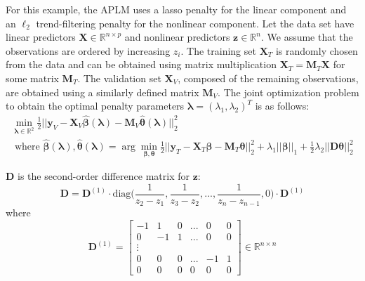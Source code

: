 \documentclass[10pt,letterpaper]{article}
\begin{document}
For this example, the APLM uses a lasso penalty for the linear component and an $\ell_2$ trend-filtering penalty for the nonlinear component. Let the data set have linear predictors $\boldsymbol{X} \in \mathbb{R}^{n \times p}$ and nonlinear predictors $\boldsymbol{z} \in \mathbb{R}^n$. We assume that the observations are ordered by increasing $z_i$. The training set $\boldsymbol{X}_T$ is randomly chosen from the data and can be obtained using matrix multiplication $ \boldsymbol{X}_T = \boldsymbol{M}_T \boldsymbol{X}$ for some matrix $\boldsymbol{M}_T$. The validation set $\boldsymbol{X}_V$, composed of the remaining observations, are obtained using a similarly defined matrix $\boldsymbol{M}_V$.
The joint optimization problem to obtain the optimal penalty parameters $\boldsymbol\lambda = (\lambda_1, \lambda_2)^T$ is as follows:
\begin{equation}
\begin{array}{c}
\min_{\boldsymbol\lambda \in \mathbb{R}^2} \frac{1}{2}
\bigl\lvert\bigl\lvert
\boldsymbol{y}_V
- \boldsymbol{X}_V\hat{\boldsymbol{\beta}}(\boldsymbol{\lambda})
- \boldsymbol{M}_V \hat{\boldsymbol{\theta}}(\boldsymbol{\lambda})
\bigl\rvert\bigl\rvert^2_2 \\
\text{ where } \hat{\boldsymbol{\beta}}(\boldsymbol{\lambda}),
\hat{\boldsymbol{\theta}}(\boldsymbol{\lambda}) =
\arg\min_{\boldsymbol{\beta}, \boldsymbol{\theta}}
\frac{1}{2} \bigl\lvert\bigl\lvert
\boldsymbol{y}_T
- \boldsymbol{X}_T\boldsymbol{\beta}
- \boldsymbol{M}_T \boldsymbol{\theta} \bigl\rvert\bigl\rvert^2_2
+ \lambda_1 \lvert\lvert \boldsymbol{\beta}
\rvert \rvert_1
+ \frac{1}{2} \lambda_2 \lvert\lvert \boldsymbol{D} \boldsymbol{\theta} \rvert \rvert_2^2
\end{array}
\end{equation}

$\boldsymbol{D}$ is the second-order difference matrix for $\boldsymbol{z}$:
\begin{equation}
\boldsymbol{D} = \boldsymbol{D}^{(1)} \cdot
\text{diag} \big ( \frac{1}{z_{2} - z_1}, \frac{1}{z_{3} - z_2}, ... , \frac{1}{z_{n} - z_{n-1}}, 0 \big )
\cdot \boldsymbol{D}^{(1)}
\end{equation}
where
\begin{equation}
\boldsymbol{D}^{(1)} = 
\begin{bmatrix}
-1 & 1 & 0 & ... & 0 & 0 \\
0 & -1 & 1 & ... & 0 & 0 \\
\vdots \\
0 & 0 & 0 & ... & -1 & 1 \\
0 &0 & 0 &  0  &  0 & 0
\end{bmatrix}
\in
\mathbb{R}^{n\times n}
\end{equation}
\end{document}
